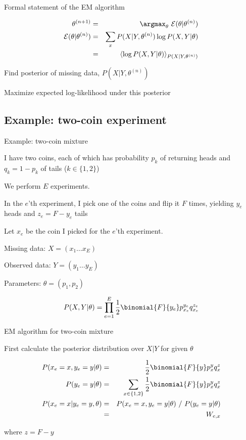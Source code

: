\documentclass{beamer}
\begin{document}
\begin{frame}{Formal statement of the EM algorithm}

\begin{eqnarray*}
\theta^{(n+1)} & = & \argmax_{\theta}\ {\cal E}(\theta|\theta^{(n)}) \\
{\cal E}(\theta|\theta^{(n)}) & = & \sum_x P(X|Y,\theta^{(n)}) \log P(X,Y|\theta) \\
& = & \langle \log P(X,Y|\theta) \rangle_{P(X|Y,\theta^{(n)})}
\end{eqnarray*}

\itemb
\item Find posterior of missing data, $P(X|Y,\theta^{(n)})$
\item Maximize expected log-likelihood under this posterior
\iteme

\end{frame}



\subsection{Example: two-coin experiment}

\begin{frame}{Example: two-coin mixture}

\itemb
\item I have two coins, each of which has probability $p_k$ of returning heads and $q_k=1-p_k$ of tails ($k \in \{ 1,2 \}$)
\item We perform $E$ experiments.
\item In the $e$'th experiment, I pick one of the coins and flip it $F$ times, yielding $y_e$ heads and $z_e = F - y_e$ tails
\item Let $x_e$ be the coin I picked for the $e$'th experiment.
\item Missing data: $X = (x_1 \ldots x_E)$
\item Observed data: $Y = (y_1 \ldots y_E)$
\item Parameters: $\theta = (p_1, p_2)$
\iteme

\[
P(X,Y|\theta) = \prod_{e=1}^E \frac{1}{2} \binomial{F}{y_e} p_{x_e}^{y_e} q_{x_e}^{z_e}
\]

\end{frame}

\begin{frame}{EM algorithm for two-coin mixture}

First calculate the posterior distribution over $X|Y$ for given $\theta$

\begin{eqnarray*}
P(x_e=x,y_e=y|\theta) & = & \frac{1}{2} \binomial{F}{y} p_x^y q_x^z \\
P(y_e=y|\theta) & = & \sum_{x \in \{1,2\}} \frac{1}{2} \binomial{F}{y} p_x^y q_x^z \\
P(x_e=x|y_e=y,\theta) & = & P(x_e=x,y_e=y|\theta)\ /\ P(y_e=y|\theta) \\
& = & W_{e,x}
\end{eqnarray*}

where $z = F - y$

\end{frame}
\end{document}
